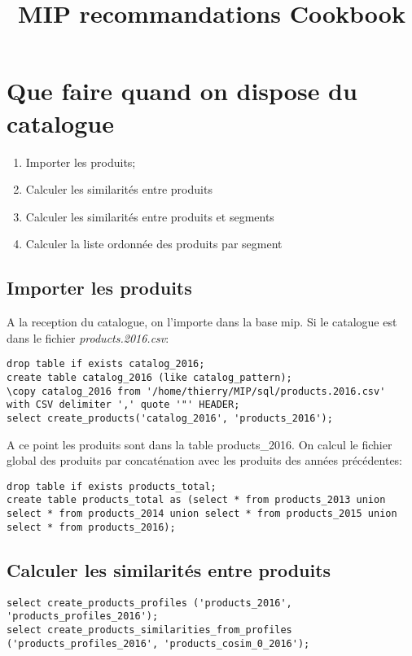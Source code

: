\documentclass[a4paper,11pt]{article}
\title {MIP recommandations Cookbook}
\begin{document}
\maketitle

\section{Que faire quand on dispose du catalogue}

\begin{enumerate}
\item Importer les produits;
\item Calculer les similarités entre produits
\item Calculer les similarités entre produits et segments
\item Calculer la liste ordonnée des produits par segment
\end{enumerate}

\subsection{Importer les produits}
A la reception du catalogue, on l'importe dans la base mip.
Si le catalogue est dans le fichier \emph{products.2016.csv}:

\begin{verbatim}
drop table if exists catalog_2016;
create table catalog_2016 (like catalog_pattern);
\copy catalog_2016 from '/home/thierry/MIP/sql/products.2016.csv' 
with CSV delimiter ',' quote '"' HEADER;
select create_products('catalog_2016', 'products_2016');
\end{verbatim}

A ce point les produits sont dans la table products\_2016. On calcul le fichier global des produits par concaténation avec les produits des années précédentes:

\begin{verbatim}
drop table if exists products_total;
create table products_total as (select * from products_2013 union select * from products_2014 union select * from products_2015 union select * from products_2016);
\end{verbatim}

\subsection{Calculer les similarités entre produits}
\begin{verbatim}
select create_products_profiles ('products_2016', 'products_profiles_2016');
select create_products_similarities_from_profiles 
('products_profiles_2016', 'products_cosim_0_2016');
\end{verbatim}
\end{document}
